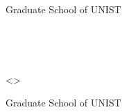 \documentclass[11pt,a4paper,onecolumn,oneside]{report}
\begin{document}





\begin{center}

\LARGE \Type

\vspace{3cm}
\huge \Title

\vfill

\LARGE \Name

\vspace{2cm}

\LARGE \Department

\LARGE \Track

\vspace{2cm}

\LARGE Graduate School of UNIST

\vspace{2cm}

\LARGE \Year

\end{center}
\thispagestyle{empty}
\clearpage

\begin{center}
\hbox{ }

\hbox{ }

\huge <\Title>

\vspace{5cm}

\LARGE \Name

\vspace{6cm}

\LARGE \Department

\LARGE \Track

\vspace{2cm}

\LARGE Graduate School of UNIST

\end{center}
\thispagestyle{empty}
\clearpage




\end{document}
